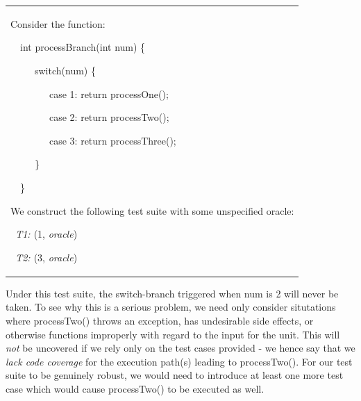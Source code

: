 \documentclass{article}
\newcommand{\tmem}[1]{{\em #1\/}}
\newcommand{\tmtextit}[1]{{\itshape{#1}}}
\newenvironment{tmparmod}[3]{\begin{list}{}{\setlength{\topsep}{0pt}\setlength{\leftmargin}{#1}\setlength{\rightmargin}{#2}\setlength{\parindent}{#3}\setlength{\listparindent}{\parindent}\setlength{\itemindent}{\parindent}\setlength{\parsep}{\parskip}} \item[]}{\end{list}}
\begin{document}
\begin{tmparmod}{1cm}{0pt}{0pt}
  \begin{tmparmod}{0pt}{1cm}{0pt}
    {\noindent}{\noindent}\begin{tabular}{l}
      \begin{tmparmod}{1cm}{0pt}{0pt}
        \begin{example}
          
        \end{example}
        
        Consider the function:
        
        
        
        \ \ int processBranch(int num) \{
        
        \ \ \ \ \ switch(num) \{
        
        \ \ \ \ \ \ \ \ case 1: return processOne();
        
        \ \ \ \ \ \ \ \ case 2: return processTwo();
        
        \ \ \ \ \ \ \ \ case 3: return processThree();
        
        \ \ \ \ \ \}
        
        \ \ \}
        
        
        
        We construct the following test suite with some unspecified oracle:
        
        \tmtextit{ \ T1: }(1, \tmtextit{oracle})
        
        \tmtextit{ \ T2: }(3, \tmtextit{oracle}) 
      \end{tmparmod}
      
      
    \end{tabular}{\hspace*{\fill}}{\smallskip}
  \end{tmparmod}
\end{tmparmod}





Under this test suite, the switch-branch triggered when num is 2 will never be
taken. To see why this is a serious problem, we need only consider situtations
where processTwo() throws an exception, has undesirable side effects, or
otherwise functions improperly with regard to the input for the unit. This
will {\tmem{not}} be uncovered if we rely only on the test cases provided - we
hence say that we {\tmem{lack code coverage}} for the execution path(s)
leading to processTwo(). For our test suite to be genuinely robust, we would
need to introduce at least one more test case which would cause processTwo()
to be executed as well.
\end{document}
